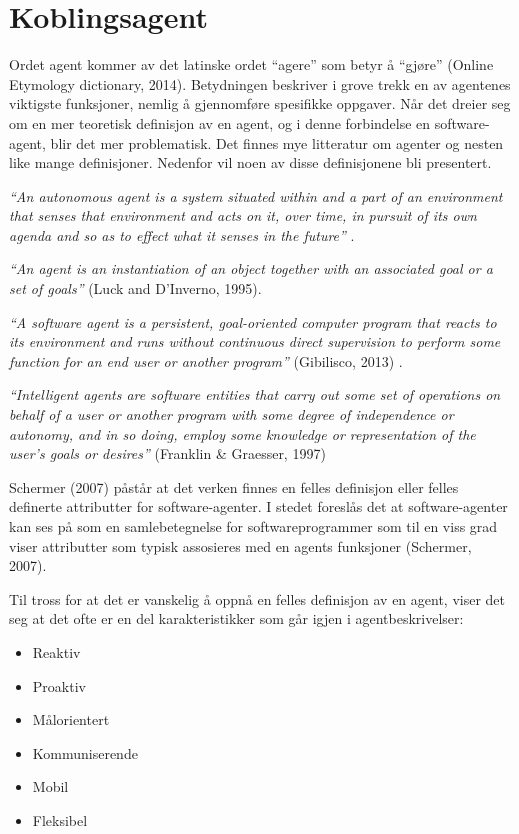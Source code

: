 \section{Koblingsagent}
Ordet agent kommer av det latinske ordet ``agere'' som betyr å ``gjøre'' (Online Etymology dictionary, 2014)\citep{website:agent}. Betydningen beskriver i grove trekk en av agentenes viktigste funksjoner, nemlig å gjennomføre spesifikke oppgaver. Når det dreier seg om en mer teoretisk definisjon av en agent, og i denne forbindelse en software-agent, blir det mer problematisk. Det finnes mye litteratur om agenter og nesten like mange definisjoner. Nedenfor vil noen av disse definisjonene bli presentert.

\textit{``An autonomous agent is a system situated within and a part of an environment
that senses that environment and acts on it, over time, in pursuit of its own agenda
and so as to effect what it senses in the future''} \citep{agent}.

\textit{``An agent is an instantiation of an object together with an associated goal or a set of goals''} (Luck and D'Inverno, 1995)\citep{luck_dinverno_agent}.

\textit{``A software agent is a persistent, goal-oriented computer program that reacts to its environment and runs without continuous direct supervision to perform some function for an end user or another program''} (Gibilisco, 2013) \citep{website:gibilesco_agent}.

\textit{``Intelligent agents are software entities that carry out some set of operations on behalf of a user or another program with some degree of independence or autonomy, and in so doing,
employ some knowledge or representation of the user's goals or desires''} (Franklin \& Graesser, 1997)\citep{agent}

Schermer (2007)\citep{schermer} påstår at det verken finnes en felles definisjon eller felles definerte attributter for software-agenter. I stedet foreslås det at software-agenter kan ses på som en samlebetegnelse for softwareprogrammer som til en viss grad viser attributter som typisk assosieres med en agents funksjoner (Schermer, 2007)\citep{schermer}.

Til tross for at det er vanskelig å oppnå en felles definisjon av en agent, viser det seg at det ofte er en del karakteristikker som går igjen i agentbeskrivelser:
\begin{itemize}
\item Reaktiv
\item Proaktiv
\item Målorientert
\item Kommuniserende
\item Mobil
\item Fleksibel
\end{itemize}

